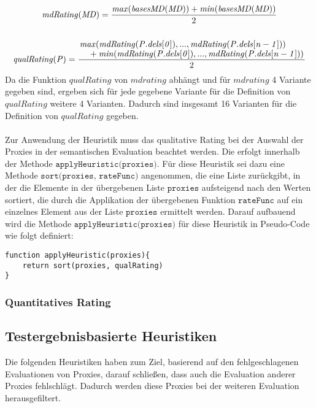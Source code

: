 \documentclass[a4paper,12pt]{article}
\begin{document}
\begin{gather*}
\mathit{mdRating(MD)} = \frac{\mathit{max(basesMD(MD))}+\mathit{min(basesMD(MD))}}{2}
\\\\
\mathit{qualRating(P)} = \frac{\splitfrac{ \mathit{max(mdRating(P.dels[0]),...,mdRating(P.dels[n-1]))}}{+\mathit{min(mdRating(P.dels[0]),...,mdRating(P.dels[n-1]))}}}{2}
\end{gather*}
\noindent
Da die Funktion $\mathit{qualRating}$ von $\mathit{mdrating}$ abhängt und für $\mathit{mdrating}$ 4 Variante gegeben sind, ergeben sich für jede gegebene Variante für die Definition von $\mathit{qualRating}$ weitere 4 Varianten. Dadurch sind insgesamt 16 Varianten für die Definition von $\mathit{qualRating}$ gegeben.\\\\
Zur Anwendung der Heuristik muss das qualitative Rating bei der Auswahl der Proxies in der semantischen Evaluation beachtet werden. Die erfolgt innerhalb der Methode $\texttt{applyHeuristic(proxies)}$. Für diese Heuristik sei dazu eine Methode $\texttt{sort(proxies, rateFunc)}$ angenommen, die eine Liste zurückgibt, in der die Elemente in der übergebenen Liste $\texttt{proxies}$ aufsteigend nach den Werten sortiert, die durch die Applikation der übergebenen Funktion $\texttt{rateFunc}$ auf ein einzelnes Element aus der Liste $\texttt{proxies}$ ermittelt werden. Darauf aufbauend wird die Methode $\texttt{applyHeuristic(proxies)}$ für diese Heuristik in Pseudo-Code wie folgt definiert:

\begin{lstlisting}[style = dsl]
function applyHeuristic(proxies){
	return sort(proxies, qualRating)
}
\end{lstlisting}

\subsubsection{Quantitatives Rating}

\subsection{Testergebnisbasierte Heuristiken}
Die folgenden Heuristiken haben zum Ziel, basierend auf den fehlgeschlagenen Evaluationen von Proxies, darauf schließen, dass auch die Evaluation anderer Proxies fehlschlägt. Dadurch werden diese Proxies bei der weiteren Evaluation herausgefiltert.
\end{document}
